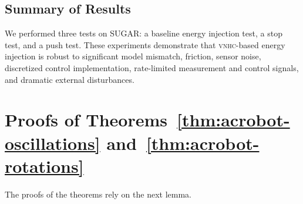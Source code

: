 \documentclass[journal,twoside,web, twocolumn]{ieeecolor}
\newcommand*{\vnhc}{\textsc{vnhc}\xspace}
\begin{document}
\subsection{Summary of Results} 
We performed three tests on SUGAR: a baseline energy injection test,
a stop test, and a push test.
These experiments demonstrate that \vnhc-based energy injection is robust to
significant model mismatch, friction, sensor noise, discretized control
implementation, rate-limited measurement and control signals, and dramatic
external disturbances.

\section{Proofs of Theorems~\ref{thm:acrobot-oscillations} and~\ref{thm:acrobot-rotations}}\label{sec:proof}

The proofs of the theorems rely on the next lemma.
\end{document}

